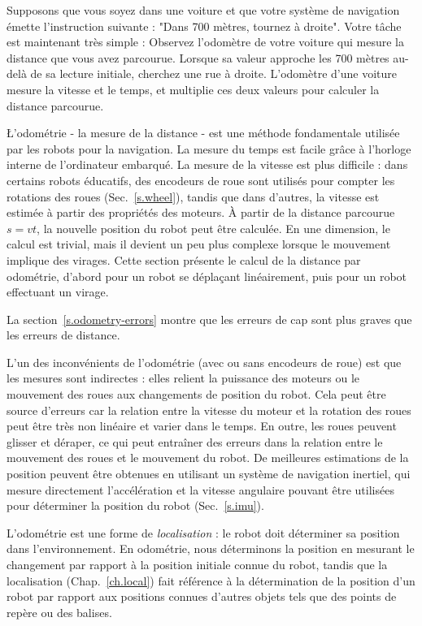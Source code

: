 {Supposons que vous soyez dans une voiture et que votre système de navigation émette l'instruction suivante : "Dans 700 mètres, tournez à droite". Votre tâche est maintenant très simple : Observez l'odomètre de votre voiture qui mesure la distance que vous avez parcourue. Lorsque sa valeur approche les 700 mètres au-delà de sa lecture initiale, cherchez une rue à droite. L'odomètre d'une voiture mesure la vitesse et le temps, et multiplie ces deux valeurs pour calculer la distance parcourue.

\L'odométrie - la mesure de la distance - est une méthode fondamentale utilisée par les robots pour la navigation. La mesure du temps est facile grâce à l'horloge interne de l'ordinateur embarqué. La mesure de la vitesse est plus difficile : dans certains robots éducatifs, des encodeurs de roue sont utilisés pour compter les rotations des roues (Sec.~\ref{s.wheel}), tandis que dans d'autres, la vitesse est estimée à partir des propriétés des moteurs. À partir de la distance parcourue $s=vt$, la nouvelle position du robot peut être calculée. En une dimension, le calcul est trivial, mais il devient un peu plus complexe lorsque le mouvement implique des virages. Cette section présente le calcul de la distance par odométrie, d'abord pour un robot se déplaçant linéairement, puis pour un robot effectuant un virage.

La section~\ref{s.odometry-errors} montre que les erreurs de cap sont plus graves que les erreurs de distance.

L'un des inconvénients de l'odométrie (avec ou sans encodeurs de roue) est que les mesures sont indirectes : elles relient la puissance des moteurs ou le mouvement des roues aux changements de position du robot. Cela peut être source d'erreurs car la relation entre la vitesse du moteur et la rotation des roues peut être très non linéaire et varier dans le temps. En outre, les roues peuvent glisser et déraper, ce qui peut entraîner des erreurs dans la relation entre le mouvement des roues et le mouvement du robot. De meilleures estimations de la position peuvent être obtenues en utilisant un système de navigation inertiel, qui mesure directement l'accélération et la vitesse angulaire pouvant être utilisées pour déterminer la position du robot (Sec.~\ref{s.imu}).

L'odométrie est une forme de \emph{localisation} : le robot doit déterminer sa position dans l'environnement. En odométrie, nous déterminons la position en mesurant le changement par rapport à la position initiale connue du robot, tandis que la localisation (Chap.~\ref{ch.local}) fait référence à la détermination de la position d'un robot par rapport aux positions connues d'autres objets tels que des points de repère ou des balises.

}
